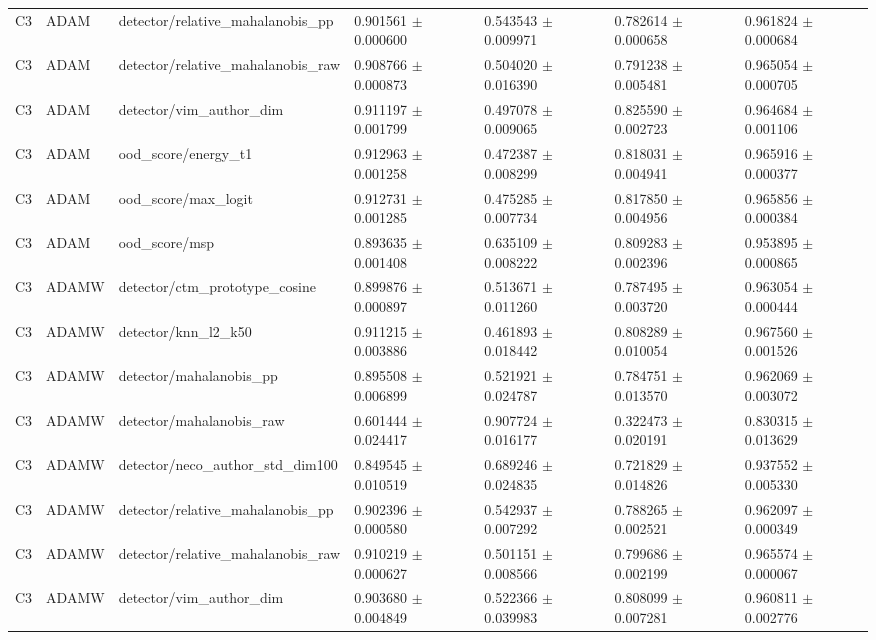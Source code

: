 \begin{longtable}{lllllll}
C3 & ADAM & detector/relative\_mahalanobis\_pp & 0.901561 $\pm$ 0.000600 & 0.543543 $\pm$ 0.009971 & 0.782614 $\pm$ 0.000658 & 0.961824 $\pm$ 0.000684 \\
C3 & ADAM & detector/relative\_mahalanobis\_raw & 0.908766 $\pm$ 0.000873 & 0.504020 $\pm$ 0.016390 & 0.791238 $\pm$ 0.005481 & 0.965054 $\pm$ 0.000705 \\
C3 & ADAM & detector/vim\_author\_dim & 0.911197 $\pm$ 0.001799 & 0.497078 $\pm$ 0.009065 & 0.825590 $\pm$ 0.002723 & 0.964684 $\pm$ 0.001106 \\
C3 & ADAM & ood\_score/energy\_t1 & 0.912963 $\pm$ 0.001258 & 0.472387 $\pm$ 0.008299 & 0.818031 $\pm$ 0.004941 & 0.965916 $\pm$ 0.000377 \\
C3 & ADAM & ood\_score/max\_logit & 0.912731 $\pm$ 0.001285 & 0.475285 $\pm$ 0.007734 & 0.817850 $\pm$ 0.004956 & 0.965856 $\pm$ 0.000384 \\
C3 & ADAM & ood\_score/msp & 0.893635 $\pm$ 0.001408 & 0.635109 $\pm$ 0.008222 & 0.809283 $\pm$ 0.002396 & 0.953895 $\pm$ 0.000865 \\
C3 & ADAMW & detector/ctm\_prototype\_cosine & 0.899876 $\pm$ 0.000897 & 0.513671 $\pm$ 0.011260 & 0.787495 $\pm$ 0.003720 & 0.963054 $\pm$ 0.000444 \\
C3 & ADAMW & detector/knn\_l2\_k50 & 0.911215 $\pm$ 0.003886 & 0.461893 $\pm$ 0.018442 & 0.808289 $\pm$ 0.010054 & 0.967560 $\pm$ 0.001526 \\
C3 & ADAMW & detector/mahalanobis\_pp & 0.895508 $\pm$ 0.006899 & 0.521921 $\pm$ 0.024787 & 0.784751 $\pm$ 0.013570 & 0.962069 $\pm$ 0.003072 \\
C3 & ADAMW & detector/mahalanobis\_raw & 0.601444 $\pm$ 0.024417 & 0.907724 $\pm$ 0.016177 & 0.322473 $\pm$ 0.020191 & 0.830315 $\pm$ 0.013629 \\
C3 & ADAMW & detector/neco\_author\_std\_dim100 & 0.849545 $\pm$ 0.010519 & 0.689246 $\pm$ 0.024835 & 0.721829 $\pm$ 0.014826 & 0.937552 $\pm$ 0.005330 \\
C3 & ADAMW & detector/relative\_mahalanobis\_pp & 0.902396 $\pm$ 0.000580 & 0.542937 $\pm$ 0.007292 & 0.788265 $\pm$ 0.002521 & 0.962097 $\pm$ 0.000349 \\
C3 & ADAMW & detector/relative\_mahalanobis\_raw & 0.910219 $\pm$ 0.000627 & 0.501151 $\pm$ 0.008566 & 0.799686 $\pm$ 0.002199 & 0.965574 $\pm$ 0.000067 \\
C3 & ADAMW & detector/vim\_author\_dim & 0.903680 $\pm$ 0.004849 & 0.522366 $\pm$ 0.039983 & 0.808099 $\pm$ 0.007281 & 0.960811 $\pm$ 0.002776 \\

\end{longtable}

